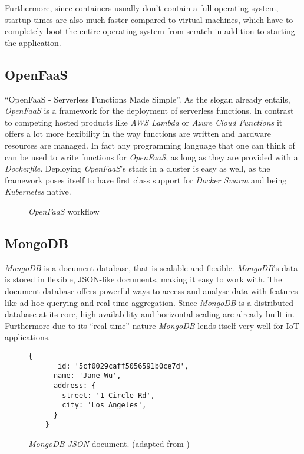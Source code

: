 Furthermore, since containers usually don't contain a full operating system, startup times are also
much faster compared to virtual machines, which have to completely boot the entire operating system
from scratch in addition to starting the application. \cite{docker-container}

\subsection{OpenFaaS}

“OpenFaaS - Serverless Functions Made Simple”. As the slogan already entails, \textit{OpenFaaS} is a
framework for the deployment of serverless functions. In contrast to competing hosted products like
\textit{AWS Lambda} or \textit{Azure Cloud Functions} it offers a lot more flexibility in the way
functions are written and hardware resources are managed. In fact any programming language that one
can think of can be used to write functions for \textit{OpenFaaS}, as long as they are provided with
a \textit{Dockerfile}. Deploying \textit{OpenFaaS}'s stack in a cluster is easy as well, as the
framework poses itself to have first class support for \textit{Docker Swarm} and being
\textit{Kubernetes} native. \cite{openfaas-docs}

\begin{figure}[H]
  \centering
  \caption{\textit{OpenFaaS} workflow \cite{openfaas-docs}}
\end{figure}

\subsection{MongoDB}

\textit{MongoDB} is a document database, that is scalable and flexible. \textit{MongoDB}'s data is
 stored in flexible, JSON-like documents, making it easy to work with. The document database offers
 powerful ways to access and analyse data with features like ad hoc querying and real time
 aggregation. Since \textit{MongoDB} is a distributed database at its core, high availability and
 horizontal scaling are already built in. Furthermore due to its “real-time” nature \textit{MongoDB}
 lends itself very well for IoT applications.  \cite{mongodb-description}

 \begin{figure}[H]
  \centering
  \begin{lstlisting}[basicstyle=\small]
    {
      _id: '5cf0029caff5056591b0ce7d',
      name: 'Jane Wu',
      address: {
        street: '1 Circle Rd',
        city: 'Los Angeles',
      }
    }
  \end{lstlisting}
  \caption{\textit{MongoDB JSON} document. (adapted from \cite{mongodb-description})}
\end{figure}

